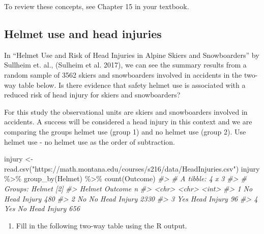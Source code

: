 \documentclass[
]{report}
\newenvironment{Shaded}{\begin{snugshade}}{\end{snugshade}}
\newcommand{\CommentTok}[1]{\textcolor[rgb]{0.56,0.35,0.01}{\textit{#1}}}
\newcommand{\FunctionTok}[1]{\textcolor[rgb]{0.00,0.00,0.00}{#1}}
\newcommand{\NormalTok}[1]{#1}
\newcommand{\OtherTok}[1]{\textcolor[rgb]{0.56,0.35,0.01}{#1}}
\newcommand{\SpecialCharTok}[1]{\textcolor[rgb]{0.00,0.00,0.00}{#1}}
\newcommand{\StringTok}[1]{\textcolor[rgb]{0.31,0.60,0.02}{#1}}
\providecommand{\tightlist}{%
  \setlength{\itemsep}{0pt}\setlength{\parskip}{0pt}}
\begin{document}
To review these concepts, see Chapter 15 in your textbook.

\hypertarget{helmet-use-and-head-injuries}{%
\subsection{Helmet use and head injuries}\label{helmet-use-and-head-injuries}}

In ``Helmet Use and Risk of Head Injuries in Alpine Skiers and Snowboarders'' by Sullheim et. al., (Sulheim et al. 2017), we can see the summary results from a random sample of 3562 skiers and snowboarders involved in accidents in the two-way table below. Is there evidence that safety helmet use is associated with a reduced risk of head injury for skiers and snowboarders?

For this study the observational units are skiers and snowboarders involved in accidents. A success will be considered a head injury in this context and we are comparing the groups helmet use (group 1) and no helmet use (group 2). Use helmet use - no helmet use as the order of subtraction.

\begin{Shaded}
\begin{Highlighting}[]
\NormalTok{injury }\OtherTok{\textless{}{-}} \FunctionTok{read.csv}\NormalTok{(}\StringTok{"https://math.montana.edu/courses/s216/data/HeadInjuries.csv"}\NormalTok{) }
\NormalTok{injury }\SpecialCharTok{\%\textgreater{}\%} \FunctionTok{group\_by}\NormalTok{(Helmet) }\SpecialCharTok{\%\textgreater{}\%} \FunctionTok{count}\NormalTok{(Outcome)}
\CommentTok{\#\textgreater{} \# A tibble: 4 x 3}
\CommentTok{\#\textgreater{} \# Groups:   Helmet [2]}
\CommentTok{\#\textgreater{}   Helmet Outcome            n}
\CommentTok{\#\textgreater{}   \textless{}chr\textgreater{}  \textless{}chr\textgreater{}          \textless{}int\textgreater{}}
\CommentTok{\#\textgreater{} 1 No     Head Injury      480}
\CommentTok{\#\textgreater{} 2 No     No Head Injury  2330}
\CommentTok{\#\textgreater{} 3 Yes    Head Injury       96}
\CommentTok{\#\textgreater{} 4 Yes    No Head Injury   656}
\end{Highlighting}
\end{Shaded}

\newpage

\begin{enumerate}
\def\labelenumi{\arabic{enumi}.}
\tightlist
\item
  Fill in the following two-way table using the R output.
\end{enumerate}
\end{document}
